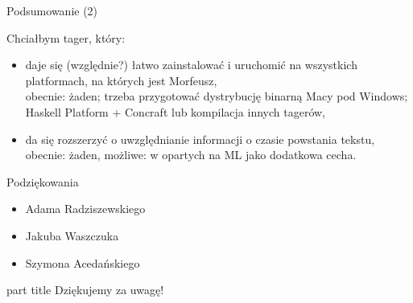\documentclass[xcolor=dvipsnames,polish]{beamer}
\begin{document}
\begin{frame}{Podsumowanie (2)}
  \vspace{0.5cm}

  Chciałbym tager, który:
   \begin{itemize}
    \item<1-> daje się (względnie?) łatwo zainstalować i uruchomić na wszystkich platformach, na których jest Morfeusz,\\
    \alert{obecnie: żaden; trzeba przygotować dystrybucję binarną Macy pod Windows; Haskell Platform + Concraft lub kompilacja innych tagerów,}
    \item<2-> da się rozszerzyć o uwzględnianie informacji o czasie powstania tekstu,\\
    \alert{obecnie: żaden, możliwe: w opartych na ML jako dodatkowa cecha.}
  \end{itemize}
\end{frame}

\begin{frame}{Podziękowania}
  \begin{itemize}
    \item Adama Radziszewskiego
    \item Jakuba Waszczuka
    \item Szymona Acedańskiego
  \end{itemize}
\end{frame}

\begin{frame}{}
\begin{centering}
    \begin{beamercolorbox}[sep=12pt,center]{part title}
    Dziękujemy za uwagę!\par
    \end{beamercolorbox}
    \end{centering}
\end{frame}
\end{document}
